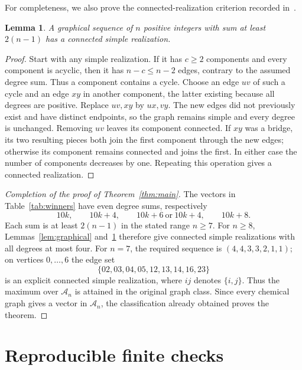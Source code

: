 \documentclass[11pt]{article}
\newtheorem{lemma}[theorem]{Lemma}
\begin{document}
For completeness, we also prove the connected-realization criterion
recorded in~\cite[(1.6)]{erdosgallai}.
\begin{lemma}\label{lem:connected}
A graphical sequence of $n$ positive integers with sum at least
$2(n-1)$ has a connected simple realization.
\end{lemma}
\begin{proof}
Start with any simple realization. If it has $c\geq2$ components and
every component is acyclic, then it has $n-c\leq n-2$ edges, contrary to
the assumed degree sum. Thus a component contains a cycle. Choose an
edge $uv$ of such a cycle and an edge $xy$ in another component, the
latter existing because all degrees are positive. Replace $uv,xy$ by
$ux,vy$. The new edges did not previously exist and have distinct
endpoints, so the graph remains simple and every degree is unchanged.
Removing $uv$ leaves its component connected. If $xy$ was a bridge,
its two resulting pieces both join the first component through the new
edges; otherwise its component remains connected and joins the first.
In either case the number of components decreases by one. Repeating
this operation gives a connected realization.
\end{proof}

\begin{proof}[Completion of the proof of Theorem~\ref{thm:main}]
The vectors in Table~\ref{tab:winners} have even degree sums, respectively
\[
 10k,\qquad 10k+4,\qquad 10k+6\ \text{or}\ 10k+4,
 \qquad 10k+8.
\]
Each sum is at least $2(n-1)$ in the stated range $n\geq7$.
For $n\geq8$, Lemmas~\ref{lem:graphical} and~\ref{lem:connected} therefore
give connected simple realizations with all degrees at most four.
For $n=7$, the required sequence is $(4,4,3,3,2,1,1)$; on vertices
$0,\ldots,6$ the edge set
\[
 \{02,03,04,05,12,13,14,16,23\}
\]
is an explicit connected simple realization, where $ij$ denotes $\{i,j\}$.
Thus the maximum over $\mathcal A_n$ is attained in the original graph
class. Since every chemical graph gives a vector in $\mathcal A_n$, the
classification already obtained proves the theorem.
\end{proof}

\section{Reproducible finite checks}
\end{document}
